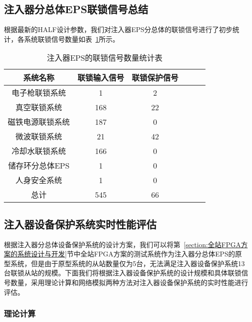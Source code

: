\subsection{注入器分总体EPS联锁信号总结}

根据最新的HALF设计参数，我们对注入器EPS分总体的联锁信号进行了初步统计，各系统联锁信号数量如表~\ref{table:4.2}所示。

\begin{table}[!hbt]
  \centering
  \caption{注入器EPS的联锁信号数量统计表}
  \label{table:4.2} 
  \begin{center}
  \begin{tabular}{cccccc}
    \toprule

     系统名称&联锁输入信号&联锁保护信号\\
    \midrule
    电子枪联锁系统& 1& 2 \\
    
    真空联锁系统  & 168 & 22 \\
    
    磁铁电源联锁系统 &187 & 0\\
    
    微波联锁系统 & 21 & 42 \\
    
    冷却水联锁系统  & 166& 0\\

    储存环分总体EPS & 1& 0\\
    
    人身安全系统& 1& 0\\

    总计&545& 66\\

    \bottomrule
  \end{tabular}
\end{center}
\end{table}


\subsection{注入器设备保护系统实时性能评估}

根据注入器分总体设备保护系统的设计方案，我们可以将第~\ref{section:全站FPGA方案的系统设计与开发}节中全站FPGA方案的测试系统作为注入器分总体EPS的原型系统，但是由于原型系统的从站数量仅为5台，无法满足注入器设备保护系统13台联锁从站的规模。下面我们将根据注入器设备保护系统的设计规模和具体联锁信号数量，采用理论计算和网络模拟两种方法对注入器设备保护系统的实时性能进行评估。

\subsubsection{理论计算}

